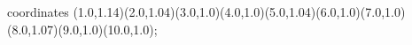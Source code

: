 					coordinates { (1.0,1.14)(2.0,1.04)(3.0,1.0)(4.0,1.0)(5.0,1.04)(6.0,1.0)(7.0,1.0)(8.0,1.07)(9.0,1.0)(10.0,1.0)};